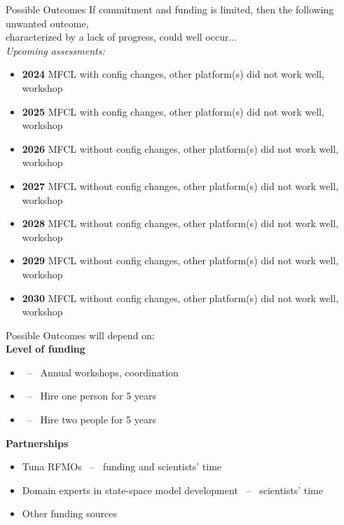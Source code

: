 \documentclass[aspectratio=169,fleqn]{beamer}
\begin{document}
\begin{frame}{Possible Outcomes}\small
  If commitment and funding is limited, then the following unwanted outcome,\\
  characterized by a lack of progress, could well occur...\\[2ex]
  \textit{Upcoming assessments:}
  \begin{itemize}
    \item[] {\bf 2024} MFCL with config changes, other platform(s) did not work
    well, workshop
    \item[] {\bf 2025} MFCL with config changes, other platform(s) did not work
    well, workshop
    \item[] {\bf 2026} MFCL without config changes, other platform(s) did not
    work well, workshop
    \item[] {\bf 2027} MFCL without config changes, other platform(s) did not
    work well, workshop
    \item[] {\bf 2028} MFCL without config changes, other platform(s) did not
    work well, workshop
    \item[] {\bf 2029} MFCL without config changes, other platform(s) did not
    work well, workshop
    \item[] {\bf 2030} MFCL without config changes, other platform(s) did not
    work well, workshop
  \end{itemize}
\end{frame}


\begin{frame}{Possible Outcomes}\small
  will depend on:\\[3ex]
  \textbf{Level of funding}
  \begin{itemize}
    \item[]  ~--~ Annual workshops, coordination\\[-1ex]
    \item[]  ~--~ Hire one person for 5 years\\[-1ex]
    \item[]  ~--~ Hire two people for 5 years\\[5ex]
  \end{itemize}
  \textbf{Partnerships}
  \begin{itemize}
    \item[] Tuna RFMOs ~--~ funding and scientists' time\\[-1ex]
    \item[] Domain experts in state-space model development ~--~ scientists'
    time\\[-1ex]
    \item[] Other funding sources\\[1ex]
  \end{itemize}
\end{frame}
\end{document}
